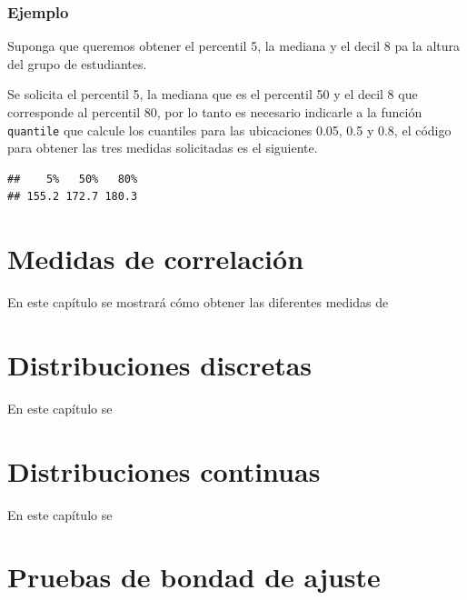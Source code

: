\documentclass[10pt,]{krantz}
\makeatletter
\newenvironment{Shaded}{\begin{snugshade}}{\end{snugshade}}
\newcommand{\KeywordTok}[1]{\textcolor[rgb]{0.13,0.29,0.53}{\textbf{{#1}}}}
\newcommand{\DataTypeTok}[1]{\textcolor[rgb]{0.13,0.29,0.53}{{#1}}}
\newcommand{\FloatTok}[1]{\textcolor[rgb]{0.00,0.00,0.81}{{#1}}}
\newcommand{\NormalTok}[1]{{#1}}
\newenvironment{kframe}{%
\medskip{}
\setlength{\fboxsep}{.8em}
 \def\at@end@of@kframe{}%
 \ifinner\ifhmode%
  \def\at@end@of@kframe{\end{minipage}}%
  \begin{minipage}{\columnwidth}%
 \fi\fi%
 \def\FrameCommand##1{\hskip\@totalleftmargin \hskip-\fboxsep
 \colorbox{shadecolor}{##1}\hskip-\fboxsep
     \hskip-\linewidth \hskip-\@totalleftmargin \hskip\columnwidth}%
 \MakeFramed {\advance\hsize-\width
   \@totalleftmargin\z@ \linewidth\hsize
   \@setminipage}}%
 {\par\unskip\endMakeFramed%
 \at@end@of@kframe}
\renewenvironment{Shaded}{\begin{kframe}}{\end{kframe}}
\makeatother
\begin{document}
\subsection*{Ejemplo}\label{ejemplo-29}


Suponga que queremos obtener el percentil 5, la mediana y el decil 8 pa
la altura del grupo de estudiantes.

Se solicita el percentil 5, la mediana que es el percentil 50 y el decil
8 que corresponde al percentil 80, por lo tanto es necesario indicarle a
la función \texttt{quantile} que calcule los cuantiles para las
ubicaciones 0.05, 0.5 y 0.8, el código para obtener las tres medidas
solicitadas es el siguiente.

\begin{Shaded}
\end{Shaded}

\begin{verbatim}
##    5%   50%   80% 
## 155.2 172.7 180.3
\end{verbatim}

\chapter{\texorpdfstring{Medidas de correlación
\label{correl}}{Medidas de correlación }}\label{medidas-de-correlacion}

En este capítulo se mostrará cómo obtener las diferentes medidas de

\chapter{Distribuciones discretas}\label{distribuciones-discretas}

En este capítulo se

\chapter{Distribuciones continuas}\label{distribuciones-continuas}

En este capítulo se

\chapter{Pruebas de bondad de ajuste}\label{pruebas-de-bondad-de-ajuste}
\end{document}
